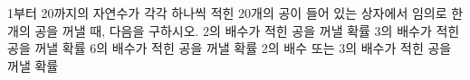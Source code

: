 1부터 20까지의 자연수가 각각 하나씩 적힌 20개의 공이 들어 있는 상자에서 임의로 한 개의 공을 꺼낼 때, 다음을 구하시오.
 2의 배수가 적힌 공을 꺼낼 확률
 3의 배수가 적힌 공을 꺼낼 확률
 6의 배수가 적힌 공을 꺼낼 확률
 2의 배수 또는 3의 배수가 적힌 공을 꺼낼 확률

